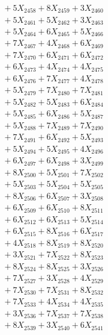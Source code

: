 \documentclass[a4paper,10pt]{article}
\begin{document}
{\begin{align}
&\;  + 5 X_{2458} + 8 X_{2459} + 3 X_{2460} \\[0.3ex]
&\;  + 5 X_{2461} + 5 X_{2462} + 3 X_{2463} \\[0.3ex]
&\;  + 5 X_{2464} + 6 X_{2465} + 5 X_{2466} \\[0.3ex]
&\;  + 7 X_{2467} + 4 X_{2468} + 6 X_{2469} \\[0.5ex]\allowbreak
&\;  + 7 X_{2470} + 6 X_{2471} + 6 X_{2472} \\[0.3ex]
&\;  + 6 X_{2473} + 4 X_{2474} + 4 X_{2475} \\[0.3ex]
&\;  + 6 X_{2476} + 7 X_{2477} + 4 X_{2478} \\[0.3ex]
&\;  + 5 X_{2479} + 7 X_{2480} + 7 X_{2481} \\[0.3ex]
&\;  + 5 X_{2482} + 5 X_{2483} + 6 X_{2484} \\[0.3ex]
&\;  + 5 X_{2485} + 6 X_{2486} + 5 X_{2487} \\[0.3ex]
&\;  + 5 X_{2488} + 7 X_{2489} + 7 X_{2490} \\[0.3ex]
&\;  + 7 X_{2491} + 6 X_{2492} + 5 X_{2493} \\[0.3ex]
&\;  + 5 X_{2494} + 5 X_{2495} + 4 X_{2496} \\[0.3ex]
&\;  + 6 X_{2497} + 6 X_{2498} + 3 X_{2499} \\[0.5ex]\allowbreak
&\;  + 8 X_{2500} + 5 X_{2501} + 7 X_{2502} \\[0.3ex]
&\;  + 5 X_{2503} + 5 X_{2504} + 5 X_{2505} \\[0.3ex]
&\;  + 8 X_{2506} + 6 X_{2507} + 3 X_{2508} \\[0.3ex]
&\;  + 6 X_{2509} + 6 X_{2510} + 8 X_{2511} \\[0.3ex]
&\;  + 6 X_{2512} + 6 X_{2513} + 5 X_{2514} \\[0.3ex]
&\;  + 6 X_{2515} + 8 X_{2516} + 6 X_{2517} \\[0.3ex]
&\;  + 4 X_{2518} + 8 X_{2519} + 8 X_{2520} \\[0.3ex]
&\;  + 3 X_{2521} + 7 X_{2522} + 8 X_{2523} \\[0.3ex]
&\;  + 8 X_{2524} + 8 X_{2525} + 3 X_{2526} \\[0.3ex]
&\;  + 7 X_{2527} + 3 X_{2528} + 4 X_{2529} \\[0.5ex]\allowbreak
&\;  + 7 X_{2530} + 7 X_{2531} + 8 X_{2532} \\[0.3ex]
&\;  + 7 X_{2533} + 4 X_{2534} + 4 X_{2535} \\[0.3ex]
&\;  + 3 X_{2536} + 7 X_{2537} + 7 X_{2538} \\[0.3ex]
&\;  + 8 X_{2539} + 3 X_{2540} + 6 X_{2541} \\[0.3ex]

\end{align}}
\end{document}
